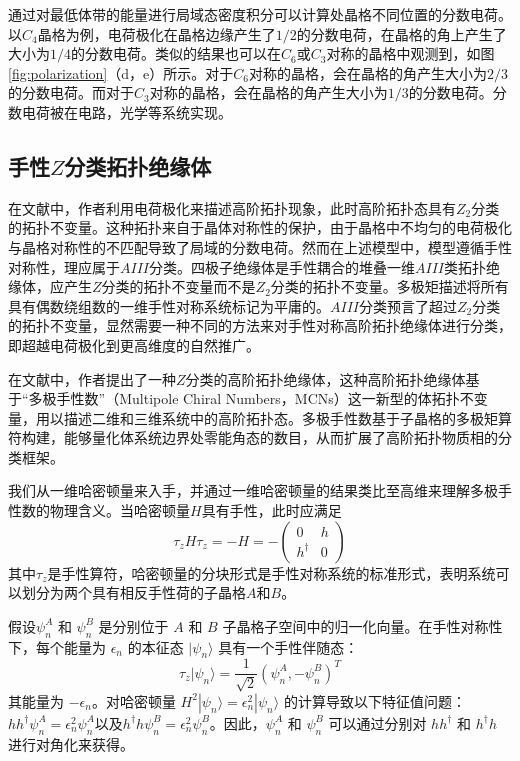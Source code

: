 通过对最低体带的能量进行局域态密度积分可以计算处晶格不同位置的分数电荷。以$C_4$晶格为例，电荷极化在晶格边缘产生了$1/2$的分数电荷，在晶格的角上产生了大小为$1/4$的分数电荷。类似的结果也可以在$C_6$或$C_3$对称的晶格中观测到，如图\ref{fig:polarization}（d，e）所示。对于$C_6$对称的晶格，会在晶格的角产生大小为$2/3$的分数电荷。而对于$C_3$对称的晶格，会在晶格的角产生大小为$1/3$的分数电荷。分数电荷被在电路\cite{peterson2020fractional}，光学\cite{liu2021bulk}等系统实现。

\subsection{手性$Z$分类拓扑绝缘体}
在文献\cite{benalcazar2017quantized,benalcazar2019quantization}中，作者利用电荷极化来描述高阶拓扑现象，此时高阶拓扑态具有$Z_2$分类的拓扑不变量。这种拓扑来自于晶体对称性的保护，由于晶格中不均匀的电荷极化与晶格对称性的不匹配导致了局域的分数电荷。然而在上述模型中，模型遵循手性对称性，理应属于$AIII$分类。四极子绝缘体是手性耦合的堆叠一维$AIII$类拓扑绝缘体，应产生$Z$分类的拓扑不变量而不是$Z_2$分类的拓扑不变量\cite{benalcazar2022chiral}。多极矩描述将所有具有偶数绕组数的一维手性对称系统标记为平庸的。$AIII$分类预言了超过$Z_2$分类的拓扑不变量，显然需要一种不同的方法来对手性对称高阶拓扑绝缘体进行分类，即超越电荷极化到更高维度的自然推广。

在文献\cite{benalcazar2022chiral}中，作者提出了一种$Z$分类的高阶拓扑绝缘体，这种高阶拓扑绝缘体基于“多极手性数”（Multipole Chiral Numbers，MCNs）这一新型的体拓扑不变量，用以描述二维和三维系统中的高阶拓扑态。多极手性数基于子晶格的多极矩算符构建，能够量化体系统边界处零能角态的数目，从而扩展了高阶拓扑物质相的分类框架。

我们从一维哈密顿量来入手，并通过一维哈密顿量的结果类比至高维来理解多极手性数的物理含义。当哈密顿量$H$具有手性，此时应满足
\begin{equation}
\tau_z H \tau_z = -H = -
\begin{pmatrix}
0 & h \\
h^\dagger & 0
\end{pmatrix}
\end{equation}
其中$\tau_z$是手性算符，哈密顿量的分块形式是手性对称系统的标准形式，表明系统可以划分为两个具有相反手性荷的子晶格$A$和$B$。

假设\(\psi_n^A\) 和 \(\psi_n^B\) 是分别位于 \( A \) 和 \( B \) 子晶格子空间中的归一化向量。在手性对称性下，每个能量为 \( \epsilon_n \) 的本征态 \( |\psi_n\rangle \) 具有一个手性伴随态：
\begin{equation}
\tau_z |\psi_n\rangle = \frac{1}{\sqrt{2}} (\psi_n^A, -\psi_n^B)^T
\end{equation}
其能量为 \( -\epsilon_n \)。对哈密顿量 \( H^2 |\psi_n\rangle = \epsilon_n^2 |\psi_n\rangle \) 的计算导致以下特征值问题：$h h^\dagger \psi_n^A = \epsilon_n^2 \psi_n^A$以及$h^\dagger h \psi_n^B = \epsilon_n^2 \psi_n^B$。因此，\(\psi_n^A\) 和 \(\psi_n^B\) 可以通过分别对 \( h h^\dagger \) 和 \( h^\dagger h \) 进行对角化来获得。

